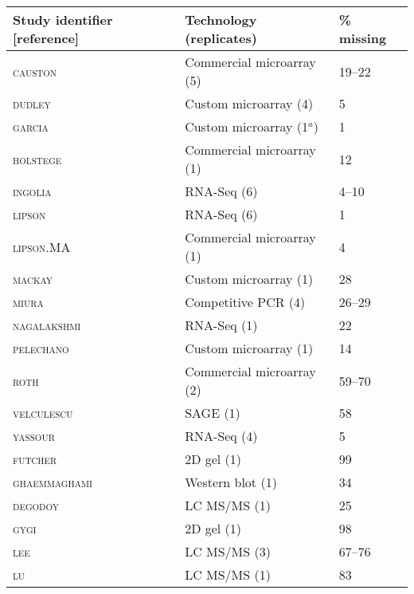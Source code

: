 \documentclass[10pt]{article}
\begin{document}
\begin{table}[!ht]
\renewcommand{\arraystretch}{1.2}
\begin{tabular}{lll}
Study identifier [reference]                    & Technology (replicates)   & \% missing\\
\hline
\textsc{causton} \cite{causton01}       & Commercial microarray (5) & 19--22 \\
\textsc{dudley}  \cite{dudley02}        & Custom microarray (4)     & 5      \\
\textsc{garcia} \cite{garciamartinez04} & Custom microarray (1$^a$)     & 1      \\
\textsc{holstege} \cite{holstege98}     & Commercial microarray (1) & 12     \\
\textsc{ingolia} \cite{ingolia09,Ingolia2010}       & RNA-Seq (6)               & 4--10  \\
\textsc{lipson} \cite{lipson09}         & RNA-Seq (6)               & 1      \\
\textsc{lipson}.MA \cite{lipson09}      & Commercial microarray (1) & 4      \\
\textsc{mackay} \cite{mackay04}         & Custom microarray (1)     & 28     \\
\textsc{miura} \cite{miura08}           & Competitive PCR (4)       & 26--29 \\
\textsc{nagalakshmi} \cite{nagalakshmi08} & RNA-Seq (1)             & 22     \\
\textsc{pelechano} \cite{pelechano10}   & Custom microarray (1)     & 14     \\
\textsc{roth} \cite{roth98}             & Commercial microarray (2) & 59--70 \\
\textsc{velculescu} \cite{velculescu97} & SAGE (1)                  & 58     \\
\textsc{yassour} \cite{yassour09}       & RNA-Seq (4)               & 5      \\
\hline
\textsc{futcher} \cite{futcher99}       & 2D gel (1)                & 99     \\
\textsc{ghaemmaghami} \cite{ghaemmaghami03} & Western blot (1)      & 34     \\
\textsc{degodoy} \cite{degodoy08}       & LC MS/MS (1)              & 25     \\
\textsc{gygi} \cite{gygi99}             & 2D gel (1)                & 98     \\
\textsc{lee} \cite{lee11}               & LC MS/MS (3)              & 67--76 \\
\textsc{lu} \cite{lu07}                 & LC MS/MS (1)              & 83     \\

\end{tabular}
\end{table}
\end{document}
